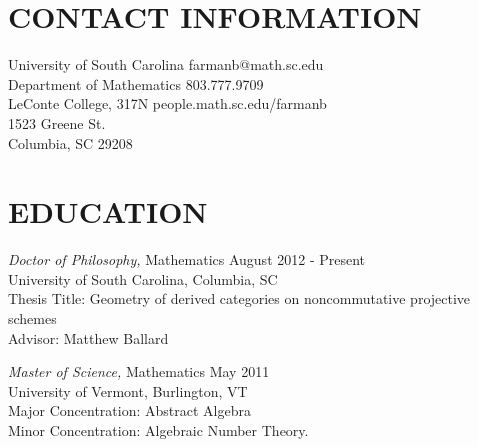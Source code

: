 \documentclass[line,overlapped]{res}
\begin{document}

\begin{resume}
  

  \section{CONTACT INFORMATION}
	University of South Carolina \hfill farmanb@math.sc.edu\\
	Department of Mathematics \hfill 803.777.9709\\
	LeConte College, 317N \hfill people.math.sc.edu/farmanb\\
	1523 Greene St.\\
	Columbia, SC 29208
	

  \section{EDUCATION} 
          {\sl Doctor of Philosophy,} Mathematics \hfill August 2012 - Present\\
          University of South Carolina, Columbia, SC\\
          Thesis Title: Geometry of derived categories on noncommutative projective schemes\\
          Advisor: Matthew Ballard

          {\sl Master of Science,} Mathematics \hfill May 2011\\
          University of Vermont, Burlington, VT\\
          Major Concentration: Abstract Algebra\\
          Minor Concentration: Algebraic Number Theory.


\end{resume}
\end{document}
